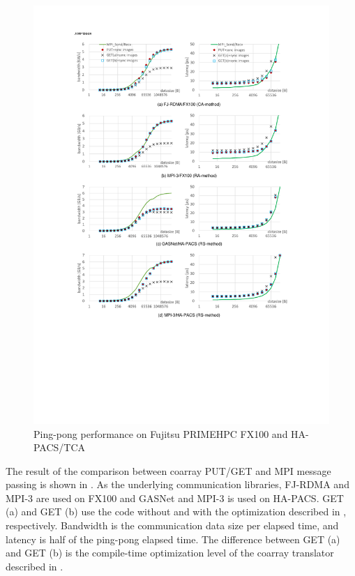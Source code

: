 
\begin{figure}[p]
  \begin{center}
    \mbox{\includegraphics[trim=30mm 70mm 30mm 23mm, scale=0.78, clip]{graphs/8graphs-8.pdf}}
    \caption{Ping-pong performance on Fujitsu PRIMEHPC FX100 and HA-PACS/TCA}\label{fig:8graphs}
  \end{center}
\end{figure}
The result of the comparison between coarray PUT/GET and MPI message passing is shown in
.
As the underlying communication libraries, 
FJ-RDMA and MPI-3 are used on FX100 and GASNet and MPI-3 is used on HA-PACS.
GET (a) and GET (b) use the code without and with the optimization described in
, respectively.
Bandwidth is the communication data size per elapsed time, and
latency is half of the ping-pong elapsed time.
The difference between GET (a) and GET (b) is the compile-time optimization level of the 
coarray translator described in .


